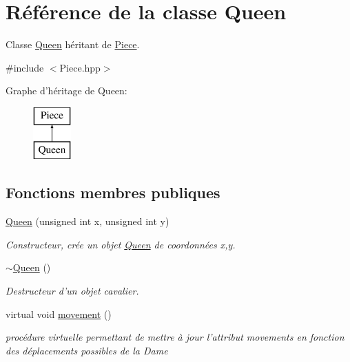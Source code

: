\hypertarget{class_queen}{\section{Référence de la classe Queen}
\label{class_queen}
}


Classe \hyperlink{class_queen}{Queen} héritant de \hyperlink{class_piece}{Piece}.  




{\ttfamily \#include $<$Piece.\-hpp$>$}

Graphe d'héritage de Queen\-:\begin{figure}[H]
\begin{center}
\leavevmode
\includegraphics[height=2.000000cm]{class_queen}
\end{center}
\end{figure}
\subsection*{Fonctions membres publiques}
\begin{DoxyCompactItemize}
\item 
\hyperlink{class_queen_a90ebaca4522d07b5a662b20c09a968aa}{Queen} (unsigned int x, unsigned int y)
\begin{DoxyCompactList}\small\item\em Constructeur, crée un objet \hyperlink{class_queen}{Queen} de coordonnées x,y. \end{DoxyCompactList}\item 
\hyperlink{class_queen_aa22f6c1a49a583b549bd1f940e50721d}{$\sim$\-Queen} ()
\begin{DoxyCompactList}\small\item\em Destructeur d'un objet cavalier. \end{DoxyCompactList}\item 
virtual void \hyperlink{class_queen_a6cf9ea1320f2ebe6fa9bb35430e63603}{movement} ()
\begin{DoxyCompactList}\small\item\em procédure virtuelle permettant de mettre à jour l'attribut movements en fonction des déplacements possibles de la Dame \end{DoxyCompactList}\end{DoxyCompactItemize}
